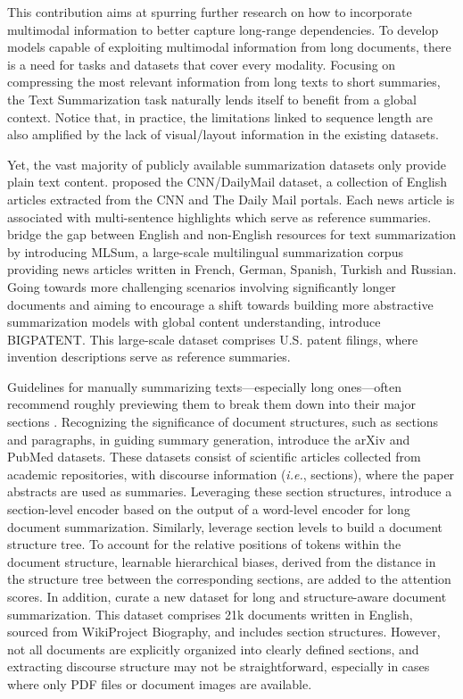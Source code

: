 This contribution aims at spurring further research on how to incorporate multimodal information to better capture long-range dependencies. To develop models capable of exploiting multimodal information from long documents, there is a need for tasks and datasets that cover every modality. Focusing on compressing the most relevant information from long texts to short summaries, the Text Summarization task naturally lends itself to benefit from a global context. Notice that, in practice, the limitations linked to sequence length are also amplified by the lack of visual/layout information in the existing datasets. 

Yet, the vast majority of publicly available summarization datasets only provide plain text content. \citet{hermann2015teaching} proposed the CNN/DailyMail dataset, a collection of English articles extracted from the CNN and The Daily Mail portals. Each news article is associated with multi-sentence highlights which serve as reference summaries. \citet{scialom2020mlsum} bridge the gap between English and non-English resources for text summarization by introducing MLSum, a large-scale multilingual summarization corpus providing news articles written in French, German, Spanish, Turkish and Russian. Going towards more challenging scenarios involving significantly longer documents and aiming to encourage a shift towards building more abstractive summarization models with global content understanding, \citet{sharma2019bigpatent} introduce BIGPATENT. This large-scale dataset comprises U.S. patent filings, where invention descriptions serve as reference summaries. 

Guidelines for manually summarizing texts—especially long ones—often recommend roughly previewing them to break them down into their major sections \citep{toprak2009three, luo2019reading}. Recognizing the significance of document structures, such as sections and paragraphs, in guiding summary generation, \citet{cohan2018discourse} introduce the arXiv and PubMed datasets. These datasets consist of scientific articles collected from academic repositories, with discourse information (\textit{i.e.}, sections), where the paper abstracts are used as summaries. Leveraging these section structures, \citet{cohan2018discourse} introduce a section-level encoder based on the output of a word-level encoder for long document summarization. Similarly, \citet{cao2022hibrids} leverage section levels to build a document structure tree. To account for the relative positions of tokens within the document structure, learnable hierarchical biases, derived from the distance in the structure tree between the corresponding sections, are added to the attention scores. In addition, \citet{cao2022hibrids} curate a new dataset for long and structure-aware document summarization. This dataset comprises 21k documents written in English, sourced from WikiProject Biography, and includes section structures. However, not all documents are explicitly organized into clearly defined sections, and extracting discourse structure may not be straightforward, especially in cases where only PDF files or document images are available.

